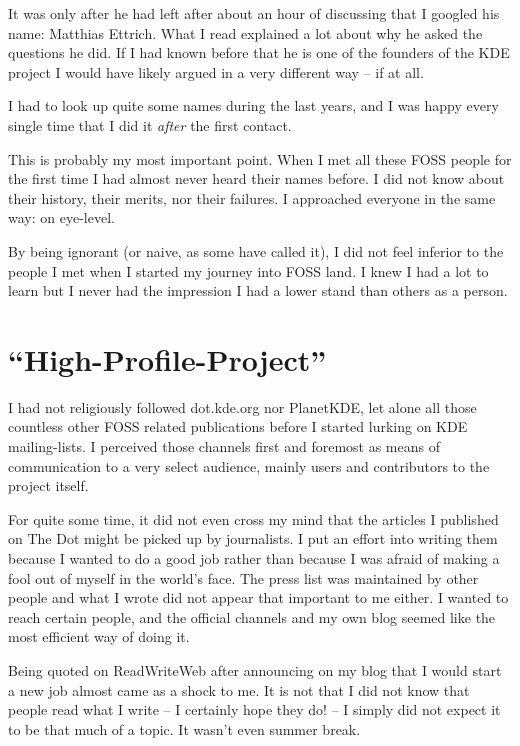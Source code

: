 It was only after he had left after about an hour of discussing that I googled
his name: Matthias Ettrich. What I read explained a lot about why he asked the
questions he did. If I had known before that he is one of the founders of the
KDE project I would have likely argued in a very different way -- if at all.

I had to look up quite some names during the last years, and I was happy every
single time that I did it \textit{after} the first contact.

This is probably my most important point. When I met all these FOSS people for
the first time I had almost never heard their names before. I did not know about
their history, their merits, nor their failures. I approached everyone in the
same way: on eye-level. 

By being ignorant (or naive, as some have called it), I did not feel inferior to
the people I met when I started my journey into FOSS land. I knew I had a lot to
learn but I never had the impression I had a lower stand than others as a
person.

\section*{``High-Profile-Project''}

I had not religiously followed dot.kde.org nor PlanetKDE, let alone all those
countless other FOSS related publications before I started lurking on KDE
mailing-lists. I perceived those channels first and foremost as means of
communication to a very select audience, mainly users and contributors to the
project itself. 

For quite some time, it did not even cross my mind that the articles I published
on The Dot might be picked up by journalists. I put an effort into writing them
because I wanted to do a good job rather than because I was afraid of making a
fool out of myself in the world's face. The press list was maintained by other
people and what I wrote did not appear that important to me either. I wanted to
reach certain people, and the official channels and my own blog seemed like the
most efficient way of doing it.

Being quoted on ReadWriteWeb after announcing on my blog that I would start a
new job almost came as a shock to me. It is not that I did not know that people
read what I write -- I certainly hope they do! -- I simply did not expect it to
be that much of a topic. It wasn't even summer break.

